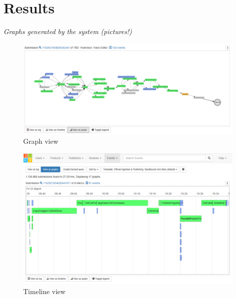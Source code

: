 \documentclass[english,12pt,a4paper,pdftex,sci,utf8]{aaltothesis}
\theoremstyle{definition}
\newcommand{\nyi}[1]{\noindent\colorbox{nyibg}{\textcolor{nyitext}{\emph{#1}}}}
\begin{document}

\clearpage
\section{Results}
\label{sec:results}


\nyi{Graphs generated by the system (pictures!)}

\begin{figure}[htb]
\centering \includegraphics[width=\linewidth]{gfx/graph.png}
\caption{Graph view \label{fig:graph}}
\end{figure}

\begin{figure}[htb]
\centering \includegraphics[width=\linewidth]{gfx/timeline.png}
\caption{Timeline view \label{fig:timeline}}
\end{figure}
\end{document}
